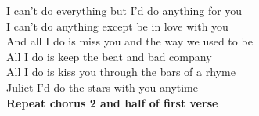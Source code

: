  I can't do everything   but I'd do anything for  you  \\
 I can't do anything except  be in love with you  \\
 And all I do is miss you  and the way we used to be    \\
 All I do is keep the beat  and bad  company  \\
 All I do is kiss you   through the bars of a  rhyme  \\
 Juliet I'd do the stars with you  anytime \\
 \textbf{Repeat chorus 2 and half of first verse}  \\
